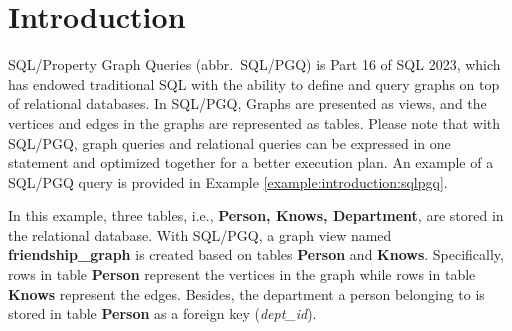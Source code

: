 \section{Introduction}

SQL/Property Graph Queries (abbr.~SQL/PGQ) is Part 16 of SQL 2023, which has endowed traditional SQL with the ability to define and query graphs on top of relational databases.
In SQL/PGQ, Graphs are presented as views, and the vertices and edges in the graphs are represented as tables.
Please note that with SQL/PGQ, graph queries and relational queries can be expressed in one statement and optimized together for a better execution plan.
An example of a SQL/PGQ query is provided in Example \ref{example:introduction:sqlpgq}.

\begin{example}
    \label{example:introduction:sqlpgq}
    In this example, three tables, i.e., \textbf{Person, Knows, Department}, are stored in the relational database.
    With SQL/PGQ, a graph view named \textbf{friendship\_graph} is created based on tables \textbf{Person} and \textbf{Knows}.
    Specifically, rows in table \textbf{Person} represent the vertices in the graph while rows in table \textbf{Knows} represent the edges.
    Besides, the department a person belonging to is stored in table \textbf{Person} as a foreign key (\textit{dept\_id}).


\end{example}
